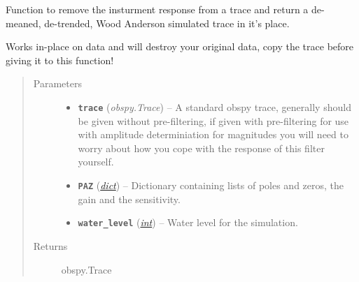 \documentclass[a4paper,10pt,english]{sphinxmanual}
\begin{document}
\begin{fulllineitems}
\label{utils:mag_calc._sim_WA}
Function to remove the insturment response from a trace and return a
de-meaned, de-trended, Wood Anderson simulated trace in it's place.

Works in-place on data and will destroy your original data, copy the
trace before giving it to this function!
\begin{quote}\begin{description}
\item[{Parameters}] \leavevmode\begin{itemize}
\item {} 
\textbf{\texttt{trace}} (\emph{obspy.Trace}) -- A standard obspy trace, generally should be given without
pre-filtering, if given with pre-filtering for use with
amplitude determiniation for magnitudes you will need to
worry about how you cope with the response of this filter
yourself.

\item {} 
\textbf{\texttt{PAZ}} (\href{https://docs.python.org/library/stdtypes.html\#dict}{\emph{dict}}) -- Dictionary containing lists of poles and zeros, the gain and
the sensitivity.

\item {} 
\textbf{\texttt{water\_level}} (\href{https://docs.python.org/library/functions.html\#int}{\emph{int}}) -- Water level for the simulation.

\end{itemize}

\item[{Returns}] \leavevmode
obspy.Trace

\end{description}\end{quote}

\end{fulllineitems}

\end{document}
